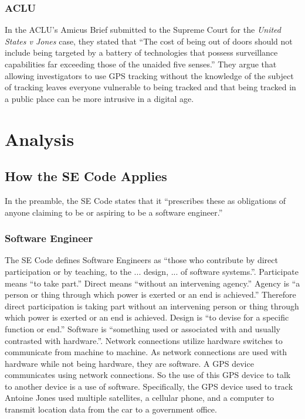 \documentclass[12pt]{article}
\newcounter{subsubsubsection}[subsubsection]
\begin{document}
\begin{multicols}{2}
\subsubsection{ACLU}
In the ACLU's Amicus Brief submitted to the Supreme Court for the \textit{United States v Jones} case, they stated that ``The cost of being out of doors should not include being targeted by a battery of technologies that possess surveillance capabilities far exceeding those of the unaided five senses.''\cite{acluamicus} They argue that allowing investigators to use GPS tracking without the knowledge of the subject of tracking leaves everyone vulnerable to being tracked and that being tracked in a public place can be more intrusive in a digital age. \cite{acluamicus}

\section{Analysis}

\subsection{How the SE Code Applies}
In the preamble, the SE Code states that it ``prescribes these as obligations of anyone claiming to be or aspiring to be a software engineer.''\cite{secode}
\subsubsection{Software Engineer}
The SE Code defines Software Engineers as ``those who contribute by direct participation or by teaching, to the ... design, ... of software systems.''\cite{secode}. 
Participate means ``to take part.''\cite{dictionary}
Direct means ``without an intervening agency.''\cite{dictionary}
Agency is ``a person or thing through which power is exerted or an end is achieved.''\cite{dictionary}
Therefore direct participation is taking part without an intervening person or thing through which power is exerted or an end is achieved.
Design is ``to devise for a specific function or end.''\cite{dictionary}
Software is ``something used or associated with and usually contrasted with hardware.''\cite{dictionary}. 
Network connections utilize hardware switches to communicate from machine to machine. \cite{networking} 
As network connections are used with hardware while not being hardware, they are software.
A GPS device communicates using network connections. \cite{gps}
So the use of this GPS device to talk to another device is a use of software. \cite{gps}
Specifically, the GPS device used to track Antoine Jones used multiple satellites, a cellular phone, and a computer to transmit location data from the car to a government office. \cite{usvjonesopinions}


\end{multicols}
\end{document}
